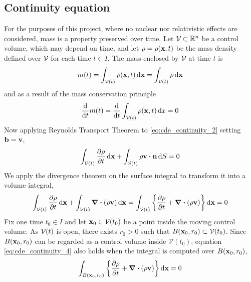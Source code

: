 
\subsection{Continuity equation}

For the purposes of this project, where no nuclear nor relativistic effects are considered, mass is a property preserved over time. Let $\mathcal{V}_{} \subset \mathbb{R}^n$ be a control volume, which may depend on time, and let $\rho = \rho(\vb{x}, t)$ be the mass density defined over $\mathcal{V}_{}$ for each time $t \in I$. The mass enclosed by $\mathcal{V}_{}$ at time $t$ is
\begin{equation}
	m(t) = \int_{\mathcal{V}(t)} \rho(\vb{x}, t) \dd{\vb{x}} = \int_{\mathcal{V}(t)} \rho \dd{\vb{x}}
\end{equation}
and as a result of the mass conservation principle
\begin{equation} \label{eq:cde_continuity_2}
	\frac{\dd}{\dd{t}} m(t) = 
	\frac{\dd}{\dd{t}} \int_{\mathcal{V}(t)} \rho(\vb{x}, t) \dd{x} = 0
\end{equation}
Now applying Reynolds Transport Theorem to \eqref{eq:cde_continuity_2} setting $\vb{b} = \vb{v}$,
\begin{equation}
	\int_\cvt \frac{\partial \rho}{\partial t} \dd{\vb{x}} + 
	\int_\cst \rho \vb{v} \vdot \vb{n} \dd{S} = 0
\end{equation}
We apply the divergence theorem on the surface integral to transform it into a volume integral,
\begin{equation} \label{eq:cde_continuity_4}
	\int_{\mathcal{V}(t)} \frac{\partial \rho}{\partial t} \dd{\vb{x}} + 
	\int_{\mathcal{V}(t)} \div(\rho \vb{v}) \dd{\vb{x}} = 
	\int_{\mathcal{V}(t)} \left\{ \frac{\partial \rho}{\partial t} + \div(\rho \vb{v}) \right\} \dd{\vb{x}} = 0
\end{equation}
Fix one time $t_0 \in I$ and let $\vb{x}_0 \in \mathcal{V}(t_0)$ be a point inside the moving control volume. As ${\mathcal{V}(t)}$ is open, there exists $r_0 > 0$ such that $B(\vb{x}_0, r_0) \subset \mathcal{V}(t_0)$. Since $B(\vb{x}_0, r_0)$ can be regarded as a control volume inside $\mathcal{V}(t_0)$, equation \eqref{eq:cde_continuity_4} also holds when the integral is computed over $B(\vb{x}_0, r_0)$, \ie
\begin{equation}
	\int_{B(\vb{x}_0, r_0)} \left\{ \frac{\partial \rho}{\partial t} + \div(\rho \vb{v}) \right\} \dd{\vb{x}} = 0
\end{equation}

